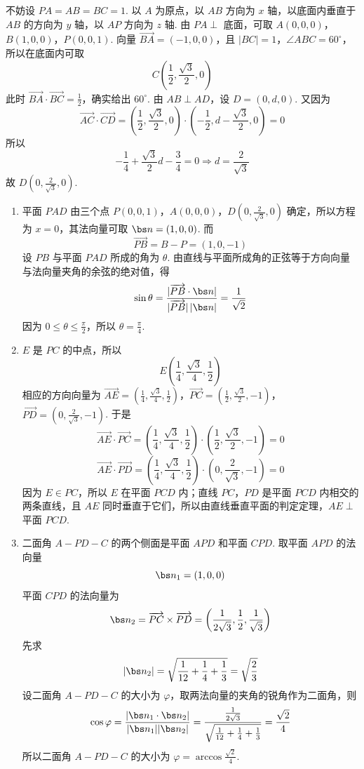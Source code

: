 \begin{solution}
不妨设 \(PA=AB=BC=1\). 以 \(A\) 为原点，以 \(AB\) 方向为 \(x\) 轴，以底面内垂直于 \(AB\) 的方向为 \(y\) 轴，以 \(AP\) 方向为 \(z\) 轴. 由 \(PA\perp\) 底面，可取
\(A(0,0,0)\)，\(B(1,0,0)\)，\(P(0,0,1)\).
向量 \(\overrightarrow{BA}=(-1,0,0)\)，且 \(|BC|=1\)，\(\angle ABC=60^\circ\)，所以在底面内可取
\[
C\left(\frac12,\frac{\sqrt3}{2},0\right)
\]
此时 \(\overrightarrow{BA}\cdot\overrightarrow{BC}=\frac12\)，确实给出 \(60^\circ\). 由 \(AB\perp AD\)，设 \(D=(0,d,0)\). 又因为
\[
\overrightarrow{AC}\cdot\overrightarrow{CD}=\left(\frac12,\frac{\sqrt3}{2},0\right)\cdot\left(-\frac12,d-\frac{\sqrt3}{2},0\right)=0
\]
所以
\[
-\frac14+\frac{\sqrt3}{2}d-\frac34=0
\Longrightarrow d=\frac2{\sqrt3}
\]
故 \(D\left(0,\frac2{\sqrt3},0\right)\).

\begin{enumerate}
\item 平面 \(PAD\) 由三个点 \(P(0,0,1)\)，\(A(0,0,0)\)，\(D(0,\frac{2}{\sqrt3},0)\) 确定，所以方程为 \(x=0\)，其法向量可取 \(\bs n=(1,0,0)\). 而
\[
\overrightarrow{PB}=B-P=(1,0,-1)
\]
设 \(PB\) 与平面 \(PAD\) 所成的角为 \(\theta\). 由直线与平面所成角的正弦等于方向向量与法向量夹角的余弦的绝对值，得
\[
\sin\theta=\frac{|\overrightarrow{PB}\cdot\bs n|}{|\overrightarrow{PB}|\,|\bs n|}=\frac1{\sqrt2}
\]
因为 \(0\leqslant\theta\leqslant\frac\pi2\)，所以 \(\theta=\frac\pi4\).
\item \(E\) 是 \(PC\) 的中点，所以
\[
E\left(\frac14,\frac{\sqrt3}{4},\frac12\right)
\]
相应的方向向量为
\(\overrightarrow{AE}=\left(\frac14,\frac{\sqrt3}{4},\frac12\right)\)，\(\overrightarrow{PC}=\left(\frac12,\frac{\sqrt3}{2},-1\right)\)，\(\overrightarrow{PD}=\left(0,\frac2{\sqrt3},-1\right)\).
于是
\[
\overrightarrow{AE}\cdot\overrightarrow{PC}=\left(\frac14,\frac{\sqrt3}{4},\frac12\right)\cdot\left(\frac12,\frac{\sqrt3}{2},-1\right)=0
\]
\[
\overrightarrow{AE}\cdot\overrightarrow{PD}=\left(\frac14,\frac{\sqrt3}{4},\frac12\right)\cdot\left(0,\frac2{\sqrt3},-1\right)=0
\]
因为 \(E\in PC\)，所以 \(E\) 在平面 \(PCD\) 内；直线 \(PC\)，\(PD\) 是平面 \(PCD\) 内相交的两条直线，且 \(AE\) 同时垂直于它们，所以由直线垂直平面的判定定理，\(AE\perp\) 平面 \(PCD\).
\item 二面角 \(A-PD-C\) 的两个侧面是平面 \(APD\) 和平面 \(CPD\). 取平面 \(APD\) 的法向量
\[
\bs n_1=(1,0,0)
\]
平面 \(CPD\) 的法向量为
\[
\bs n_2=\overrightarrow{PC}\times\overrightarrow{PD}=\left(\frac1{2\sqrt3},\frac12,\frac1{\sqrt3}\right)
\]
先求
\[
|\bs n_2|=\sqrt{\frac1{12}+\frac14+\frac13}=\sqrt{\frac23}
\]
设二面角 \(A-PD-C\) 的大小为 \(\varphi\)，取两法向量的夹角的锐角作为二面角，则
\[
\cos\varphi=\frac{|\bs n_1\cdot\bs n_2|}{|\bs n_1||\bs n_2|}=\frac{\frac1{2\sqrt3}}{\sqrt{\frac1{12}+\frac14+\frac13}}=\frac{\sqrt2}{4}
\]
所以二面角 \(A-PD-C\) 的大小为 \(\varphi=\arccos\frac{\sqrt2}{4}\).
\end{enumerate}
\end{solution}

